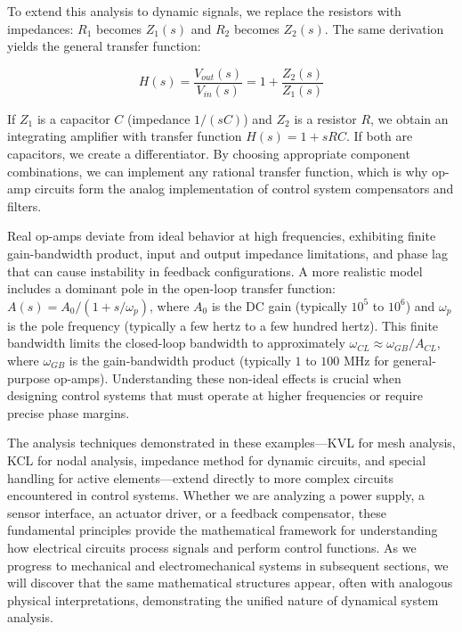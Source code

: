 \begin{example}
To extend this analysis to dynamic signals, we replace the resistors with impedances: $R_1$ becomes $Z_1(s)$ and $R_2$ becomes $Z_2(s)$. The same derivation yields the general transfer function:

\begin{equation}
H(s) = \frac{V_{out}(s)}{V_{in}(s)} = 1 + \frac{Z_2(s)}{Z_1(s)}
\end{equation}

If $Z_1$ is a capacitor $C$ (impedance $1/(sC)$) and $Z_2$ is a resistor $R$, we obtain an integrating amplifier with transfer function $H(s) = 1 + sRC$. If both are capacitors, we create a differentiator. By choosing appropriate component combinations, we can implement any rational transfer function, which is why op-amp circuits form the analog implementation of control system compensators and filters.

Real op-amps deviate from ideal behavior at high frequencies, exhibiting finite gain-bandwidth product, input and output impedance limitations, and phase lag that can cause instability in feedback configurations. A more realistic model includes a dominant pole in the open-loop transfer function: $A(s) = A_0 / (1 + s/\omega_p)$, where $A_0$ is the DC gain (typically $10^5$ to $10^6$) and $\omega_p$ is the pole frequency (typically a few hertz to a few hundred hertz). This finite bandwidth limits the closed-loop bandwidth to approximately $\omega_{CL} \approx \omega_{GB} / A_{CL}$, where $\omega_{GB}$ is the gain-bandwidth product (typically $1$ to $100$ MHz for general-purpose op-amps). Understanding these non-ideal effects is crucial when designing control systems that must operate at higher frequencies or require precise phase margins.

The analysis techniques demonstrated in these examples—KVL for mesh analysis, KCL for nodal analysis, impedance method for dynamic circuits, and special handling for active elements—extend directly to more complex circuits encountered in control systems. Whether we are analyzing a power supply, a sensor interface, an actuator driver, or a feedback compensator, these fundamental principles provide the mathematical framework for understanding how electrical circuits process signals and perform control functions. As we progress to mechanical and electromechanical systems in subsequent sections, we will discover that the same mathematical structures appear, often with analogous physical interpretations, demonstrating the unified nature of dynamical system analysis.
\end{example}

